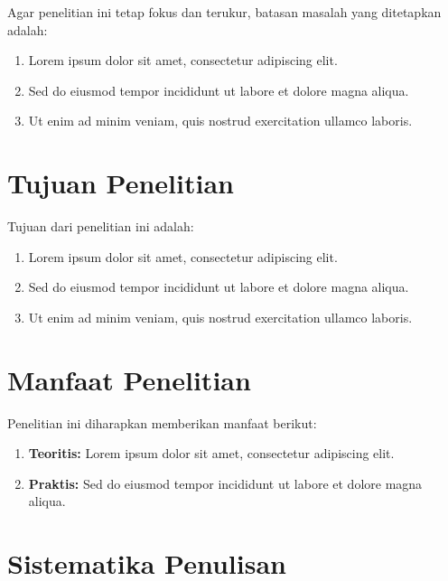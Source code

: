 
Agar penelitian ini tetap fokus dan terukur, batasan masalah yang ditetapkan adalah:

\begin{enumerate}
  \item Lorem ipsum dolor sit amet, consectetur adipiscing elit.
  \item Sed do eiusmod tempor incididunt ut labore et dolore magna aliqua.
  \item Ut enim ad minim veniam, quis nostrud exercitation ullamco laboris.
\end{enumerate}

\section{Tujuan Penelitian}


Tujuan dari penelitian ini adalah:

\begin{enumerate}
  \item Lorem ipsum dolor sit amet, consectetur adipiscing elit.
  \item Sed do eiusmod tempor incididunt ut labore et dolore magna aliqua.
  \item Ut enim ad minim veniam, quis nostrud exercitation ullamco laboris.
\end{enumerate}

\section{Manfaat Penelitian}


Penelitian ini diharapkan memberikan manfaat berikut:

\begin{enumerate}
  \item \textbf{Teoritis:} Lorem ipsum dolor sit amet, consectetur adipiscing elit.
  \item \textbf{Praktis:} Sed do eiusmod tempor incididunt ut labore et dolore magna aliqua.
\end{enumerate}

\section{Sistematika Penulisan}

